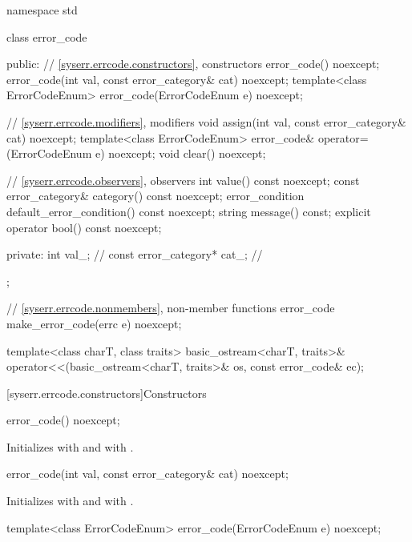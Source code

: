 %
\begin{codeblock}
namespace std {
  class error_code {
  public:
    // \ref{syserr.errcode.constructors}, constructors
    error_code() noexcept;
    error_code(int val, const error_category& cat) noexcept;
    template<class ErrorCodeEnum>
      error_code(ErrorCodeEnum e) noexcept;

    // \ref{syserr.errcode.modifiers}, modifiers
    void assign(int val, const error_category& cat) noexcept;
    template<class ErrorCodeEnum>
      error_code& operator=(ErrorCodeEnum e) noexcept;
    void clear() noexcept;

    // \ref{syserr.errcode.observers}, observers
    int value() const noexcept;
    const error_category& category() const noexcept;
    error_condition default_error_condition() const noexcept;
    string message() const;
    explicit operator bool() const noexcept;

  private:
    int val_;                   // \expos
    const error_category* cat_; // \expos
  };

  // \ref{syserr.errcode.nonmembers}, non-member functions
  error_code make_error_code(errc e) noexcept;

  template<class charT, class traits>
    basic_ostream<charT, traits>&
      operator<<(basic_ostream<charT, traits>& os, const error_code& ec);
}
\end{codeblock}

[syserr.errcode.constructors]{Constructors}

%
\begin{itemdecl}
error_code() noexcept;
\end{itemdecl}

\begin{itemdescr}
\pnum
\effects
Initializes  with 
and  with .
\end{itemdescr}

%
\begin{itemdecl}
error_code(int val, const error_category& cat) noexcept;
\end{itemdecl}

\begin{itemdescr}
\pnum
\effects
Initializes  with 
and  with .
\end{itemdescr}

%
\begin{itemdecl}
template<class ErrorCodeEnum>
  error_code(ErrorCodeEnum e) noexcept;
\end{itemdecl}

